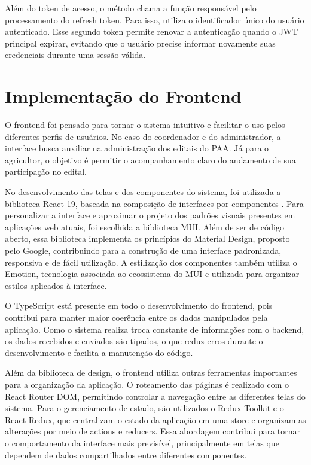 Além do token de acesso, o método chama a função responsável pelo processamento do refresh token. Para isso, utiliza o identificador único do usuário autenticado. Esse segundo token permite renovar a autenticação quando o JWT principal expirar, evitando que o usuário precise informar novamente suas credenciais durante uma sessão válida.


\section{Implementação do Frontend}

O frontend foi pensado para tornar o sistema intuitivo e facilitar o uso pelos diferentes perfis de usuários. No caso do coordenador e do administrador, a interface busca auxiliar na administração dos editais do PAA. Já para o agricultor, o objetivo é permitir o acompanhamento claro do andamento de sua participação no edital.

No desenvolvimento das telas e dos componentes do sistema, foi utilizada a biblioteca React 19, baseada na composição de interfaces por componentes \cite{react2026}. Para personalizar a interface e aproximar o projeto dos padrões visuais presentes em aplicações web atuais, foi escolhida a biblioteca MUI. Além de ser de código aberto, essa biblioteca implementa os princípios do Material Design, proposto pelo Google, contribuindo para a construção de uma interface padronizada, responsiva e de fácil utilização. A estilização dos componentes também utiliza o Emotion, tecnologia associada ao ecossistema do MUI e utilizada para organizar estilos aplicados à interface.

O TypeScript está presente em todo o desenvolvimento do frontend, pois contribui para manter maior coerência entre os dados manipulados pela aplicação. Como o sistema realiza troca constante de informações com o backend, os dados recebidos e enviados são tipados, o que reduz erros durante o desenvolvimento e facilita a manutenção do código.

Além da biblioteca de design, o frontend utiliza outras ferramentas importantes para a organização da aplicação. O roteamento das páginas é realizado com o React Router DOM, permitindo controlar a navegação entre as diferentes telas do sistema. Para o gerenciamento de estado, são utilizados o Redux Toolkit e o React Redux, que centralizam o estado da aplicação em uma store e organizam as alterações por meio de actions e reducers. Essa abordagem contribui para tornar o comportamento da interface mais previsível, principalmente em telas que dependem de dados compartilhados entre diferentes componentes.

